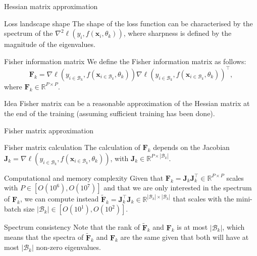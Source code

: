 \documentclass{beamer}
\begin{document}
\begin{frame}{Hessian matrix approximation}
    \begin{block}{Loss landscape shape}
        The shape of the loss function can be characterised by the spectrum of the $\nabla^2 \ell(y_i,f(\mathbf{x}_i,\theta_k))$, where sharpness is defined by the magnitude of the eigenvalues.
    \end{block}
    \begin{block}{Fisher information matrix}
        We define the Fisher information matrix as follows:
        \begin{equation}
        \mathbf{F}_k = \nabla \ell(y_{i \in \mathcal{B}_k},f(\mathbf{x}_{i \in \mathcal{B}_k},\theta_k))  \nabla \ell(y_{i \in \mathcal{B}_k},f(\mathbf{x}_{i \in \mathcal{B}_k},\theta_k))^{\top},
        \label{eq:F_k}
        \end{equation}
        where $\mathbf{F}_k \in \mathbb R^{P \times P}$. 
    \end{block}
    \begin{alertblock}{Idea}
        Fisher matrix can be a reasonable approximation of the Hessian matrix at the end of the training (assuming sufficient training has been done).
    \end{alertblock}
\end{frame}

\begin{frame}{Fisher matrix approximation}
    \begin{block}{Fisher matrix calculation}
        The calculation of $\mathbf{F}_k$ depends on the Jacobian $\mathbf{J}_k = \nabla \ell(y_{i \in \mathcal{B}_k},f(\mathbf{x}_{i \in \mathcal{B}_k},\theta_k))$, with $\mathbf{J}_k  \in \mathbb R^{P \times |\mathcal{B}_k|}$. 
    \end{block}
    \begin{alertblock}{Computational and memory complexity}
        Given that $\mathbf{F}_k = \mathbf{J}_k \mathbf{J}_k^{\top} \in \mathbb R^{P \times P}$ scales with $P \in [O(10^6),O(10^7)]$ and that we are only interested in the spectrum of $\mathbf{F}_k$, we can compute instead $\widetilde{\mathbf{F}}_k = \mathbf{J}_k^{\top} \mathbf{J}_k \in \mathbb R^{|\mathcal{B}_k| \times |\mathcal{B}_k|}$ that scales with the mini-batch size $|\mathcal{B}_k| \in [O(10^1),O(10^2)]$.  
    \end{alertblock}
    \begin{block}{Spectrum consistency}
        Note that the rank of $\widetilde{\mathbf{F}}_k$ and $\mathbf{F}_k$ is at most $|\mathcal{B}_k|$, which means that the spectra of $\widetilde{\mathbf{F}}_k$ and $\mathbf{F}_k$ are the same given that both will have at most $|\mathcal{B}_k|$ non-zero eigenvalues.
    \end{block}
\end{frame}
\end{document}
